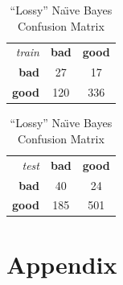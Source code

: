 \documentclass[a4paper, twocolumn]{article}
\begin{document}
        \begin{table}[h]
        \begin{center}
        \begin{tabular}{r|c|c|}
            \multicolumn{1}{r}{\emph{train}}
            &\multicolumn{1}{c}{\textbf{bad}}
            &\multicolumn{1}{c}{\textbf{good}} \\
            \cline{2-3}
            \textbf{bad} & 27 & 17 \\
            \cline{2-3}
            \textbf{good} & 120 & 336 \\
            \cline{2-3}
        \end{tabular}
        \begin{tabular}{r|c|c|}
            \multicolumn{1}{r}{\emph{test}}
            &\multicolumn{1}{c}{\textbf{bad}}
            &\multicolumn{1}{c}{\textbf{good}} \\
            \cline{2-3}
            \textbf{bad} & 40 & 24 \\
            \cline{2-3}
            \textbf{good} & 185 & 501 \\
            \cline{2-3}
        \end{tabular}
        \end{center}
        \caption{``Lossy'' Na{\"\i}ve Bayes Confusion Matrix}
        \label{table:bayes10}
        \end{table}

    \nocite{*}
    
    

    \onecolumn \appendix
    \section*{Appendix}

    
    
\end{document}
